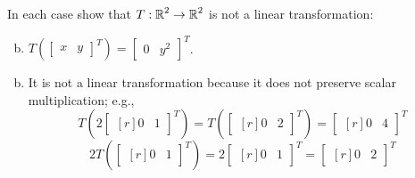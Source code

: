 \documentclass[../main.tex]{subfiles}
\begin{document}
In each case show that $T: \operatorname{\mathbb{R}}^2 \to \operatorname{\mathbb{R}}^2$ is not a linear transformation:
\begin{enumerate}[a)]
	\setcounter{enumi}{1}
	\item $T\left(\begin{bmatrix}x&y\end{bmatrix}^T\right) = \begin{bmatrix}0&y^2\end{bmatrix}^T$.
\end{enumerate}

\solution
\begin{enumerate}[a)]
	\setcounter{enumi}{1}
	\item It is not a linear transformation because it does not preserve scalar multiplication; e.g.,
		\[
			T\left(
			2
			\begin{bmatrix*}[r]
				0 & 1
			\end{bmatrix*}^T
			\right)
			=
			T\left(
			\begin{bmatrix*}[r]
				0 & 2
			\end{bmatrix*}^T
			\right)
			=
			\begin{bmatrix*}[r]
				0 & 4
			\end{bmatrix*}^T
		\]
		\[
			2
			T\left(
			\begin{bmatrix*}[r]
				0 & 1
			\end{bmatrix*}^T
			\right)
			=
			2
			\begin{bmatrix*}[r]
				0 & 1
			\end{bmatrix*}^T
			=
			\begin{bmatrix*}[r]
				0 & 2
			\end{bmatrix*}^T
		\]
\end{enumerate}
\end{document}
